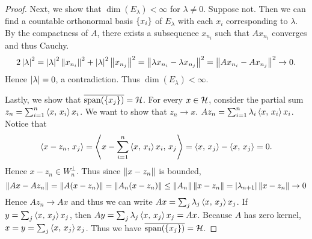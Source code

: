 \begin{proof}
    Next, we show that $\dim(E_\lambda) < \infty$ for $\lambda\neq 0$. Suppose 
    not. Then we can find a countable orthonormal basis $\left\{ {x_i} \right\}$ of $E_\lambda$ 
    with each $x_i$ corresponding to $\lambda$. By the compactness of $A$, there 
    exists a subsequence $x_{n_i}$ such that $Ax_{n_i}$ converges and thus Cauchy. 
    \begin{equation*}
        2\left\lvert {\lambda} \right\rvert^2 = \left\lvert {\lambda} \right\rvert^2\left\lVert {x_{n_i}} \right\rVert^2 + \left\lvert {\lambda} \right\rvert^2\left\lVert {x_{n_j}} \right\rVert^2 
        = \left\lVert {\lambda x_{n_i} - \lambda x_{n_j}} \right\rVert^2 = \left\lVert {Ax_{n_i} - Ax_{n_j}} \right\rVert^2 \to 0.
    \end{equation*}
    Hence $\left\lvert {\lambda} \right\rvert = 0$, a contradiction. Thus $\dim(E_\lambda) < \infty$. 

    Lastly, we show that $\overline{\spanby\pth{\set{x_j}}} = \H$. For every $x\in\mathcal{H}$, 
    consider the partial sum $z_n = \sum_{i=1}^{n}\left\langle {x},\, {x_i} \right\rangle x_i$. We want to 
    show that $z_n\to x$. $Az_n = \sum_{i=1}^{n}\lambda_i\left\langle {x},\, {x_i} \right\rangle x_i$. 
    Notice that 
    \begin{equation*}
        \left\langle {x-z_n},\, {x_j} \right\rangle = \left\langle {x - \sum_{i=1}^{n}\left\langle {x},\, {x_i} \right\rangle x_i},\, {x_j} \right\rangle 
        = \left\langle {x},\, {x_j} \right\rangle - \left\langle {x},\, {x_j} \right\rangle = 0.
    \end{equation*}
    Hence $x-z_n\in W_n^\perp$. Thus since $\left\lVert {x-z_n} \right\rVert$ is bounded,
    \begin{equation*}
        \left\lVert {Ax-Az_n} \right\rVert = \left\lVert {A(x-z_n)} \right\rVert = \left\lVert {A_n(x-z_n)} \right\rVert 
        \leq \left\lVert {A_n} \right\rVert\left\lVert {x-z_n} \right\rVert = \left\lvert {\lambda_{n+1}} \right\rvert\left\lVert {x-z_n} \right\rVert\to 0
    \end{equation*}
    Hence $Az_n\to Ax$ and thus we can write $Ax = \sum_j\lambda_j\left\langle {x},\, {x_j} \right\rangle x_j$. 
    If $y = \sum_j\left\langle {x},\, {x_j} \right\rangle x_j$, then $Ay = \sum_j\lambda_j\left\langle {x},\, {x_j} \right\rangle x_j = Ax$. 
    Because $A$ has zero kernel, $x = y = \sum_j\left\langle {x},\, {x_j} \right\rangle x_j$. Thus we have 
    $\overline{\spanby\pth{\set{x_j}}} = \H$. 


\end{proof}

